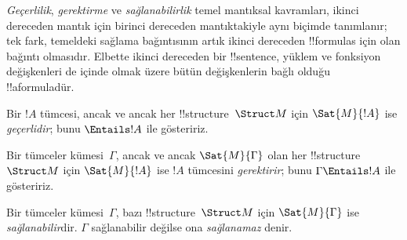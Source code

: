 \documentclass[../../../include/open-logic-section]{subfiles}
\begin{document}

\begin{explain}
\emph{Geçerlilik}, \emph{gerektirme} ve \emph{sağlanabilirlik} temel
mantıksal kavramları, ikinci dereceden mantık için birinci dereceden
mantıktakiyle aynı biçimde tanımlanır; tek fark, temeldeki sağlama
bağıntısının artık ikinci dereceden !!{formula}s için olan bağıntı olmasıdır.
Elbette ikinci dereceden bir !!{sentence}, yüklem ve fonksiyon değişkenleri
de içinde olmak üzere bütün değişkenlerin bağlı olduğu !!a{formula}{}dür.
\end{explain}

\begin{defn}[Geçerlilik]
Bir $!A$ tümcesi, ancak ve ancak her !!{structure}~$\Struct M$ için
$\Sat{M}{!A}$ ise \emph{geçerlidir}; bunu $\Entails !A$ ile gösteririz.
\end{defn}

\begin{defn}[Gerektirme]
Bir tümceler kümesi~$\Gamma$, ancak ve ancak $\Sat{M}{\Gamma}$ olan her
!!{structure}~$\Struct M$ için $\Sat{M}{!A}$ ise $!A$ tümcesini
\emph{gerektirir}; bunu $\Gamma \Entails !A$ ile gösteririz.
\end{defn}

\begin{defn}[Sağlanabilirlik]
Bir tümceler kümesi~$\Gamma$, bazı !!{structure}~$\Struct M$ için
$\Sat{M}{\Gamma}$ ise \emph{sağlanabilir}dir. $\Gamma$ sağlanabilir değilse
ona \emph{sağlanamaz} denir.
\end{defn}
\end{document}
